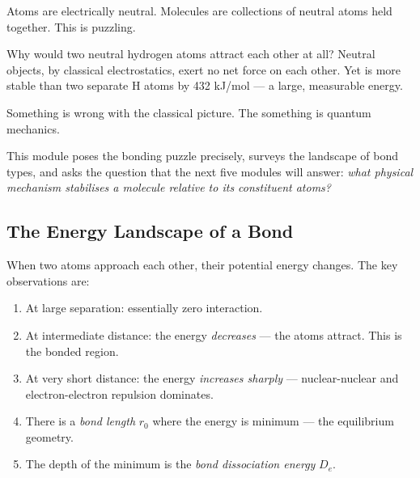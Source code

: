 \documentclass[12pt, a4paper]{book}
\newcommand{\newterm}[1]{\textit{\textcolor{DiscoveryColor}{#1}}}
\begin{document}
Atoms are electrically neutral.
Molecules are collections of neutral atoms held together.
This is puzzling.

Why would two neutral hydrogen atoms attract each other
at all?
Neutral objects, by classical electrostatics, exert no
net force on each other.
Yet  is more stable than two separate H atoms
by 432 kJ/mol --- a large, measurable energy.

Something is wrong with the classical picture.
The something is quantum mechanics.

This module poses the bonding puzzle precisely,
surveys the landscape of bond types,
and asks the question that the next five modules will answer:
\emph{what physical mechanism stabilises a molecule
relative to its constituent atoms?}

\subsection{The Energy Landscape of a Bond}

When two atoms approach each other, their potential
energy changes.
The key observations are:

\begin{enumerate}[nosep, leftmargin=2em]
  \item At large separation: essentially zero interaction.
  \item At intermediate distance: the energy \emph{decreases} ---
        the atoms attract. This is the bonded region.
  \item At very short distance: the energy \emph{increases sharply} ---
        nuclear-nuclear and electron-electron repulsion dominates.
  \item There is a \newterm{bond length} $r_0$ where the
        energy is minimum --- the equilibrium geometry.
  \item The depth of the minimum is the \newterm{bond dissociation
        energy} $D_e$.
\end{enumerate}
\end{document}
